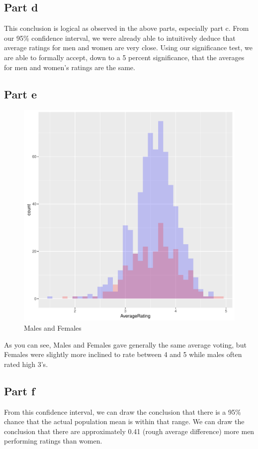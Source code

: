\documentclass{article}
\begin{document}
  \subsection*{Part d}
    This conclusion is logical as observed in the above parts, especially part c. From our 95\% confidence interval, we were already able to intuitively deduce that average ratings for men and women are very close. Using our significance test, we are able to formally accept, down to a 5 percent significance, that the averages for men and women's ratings are the same.
  \subsection*{Part e}
    \begin{figure}[H]
      \includegraphics[width=\linewidth]{histogram.png}
      \caption{Males and Females}
      \label{fig:hist1}
    \end{figure}
    As you can see, Males and Females gave generally the same average voting, but
    Females were slightly more inclined to rate between 4 and 5 while males often rated
    high 3's. 
  \subsection*{Part f}
    From this confidence interval, we can draw the conclusion that there is a 95\% chance that the actual population mean is within that range. We can draw the conclusion that there are approximately 0.41 (rough average difference) more men performing ratings than women.
\end{document}
